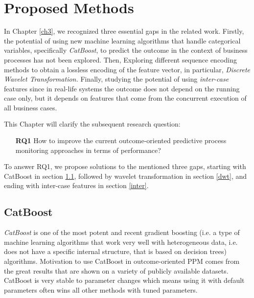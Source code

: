 
\chapter{Proposed Methods} \label{ch4}%

In Chapter \ref{ch3}, we recognized three essential gaps in the related work. Firstly, the potential of using new machine learning algorithms that handle categorical variables, specifically  \textit{CatBoost}, to predict the outcome in the context of business processes has not been explored. Then, Exploring different sequence encoding methods to obtain a lossless encoding of the feature vector, in particular, \textit{Discrete Wavelet Transformation.} Finally, studying the potential of using \textit{inter-case} features since in real-life systems the outcome does not depend on the running case only, but it depends on features that come from the concurrent execution of all business cases. 

This Chapter will clarify the subsequent research question:


\begin{itemize}[itemindent=0em]
	\item[\textbf{RQ1}] How to improve the current outcome-oriented predictive process monitoring approaches in terms of performance?	
\end{itemize}

To answer RQ1, we propose solutions to the mentioned three gaps, starting with CatBoost in section \ref{catb}, followed by wavelet transformation in section \ref{dwt}, and ending with inter-case features in section \ref{inter}.



\ifpdf
    \graphicspath{{X/figures/PNG/}{X/figures/PDF/}{X/figures/}}
\else
    \graphicspath{{X/figures/EPS/}{X/figures/}}
\fi


\section{CatBoost} \label{catb}
\textit{CatBoost} is one of the most potent and recent gradient boosting (i.e. a type of machine learning algorithms that work very well with heterogeneous data, i.e. does not have a specific internal structure, that is based on decision trees) algorithms. Motivation to use CatBoost in outcome-oriented PPM comes from the great results that are shown on a variety of publicly available datasets. CatBoost is very stable to parameter changes \cite{prokhorenkova2018catboost} which means using it with default parameters often wins all other methods with tuned parameters. 

